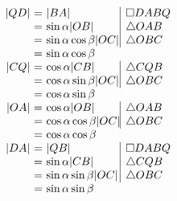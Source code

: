 \begin{frame}
\begin{columns}
$
\begin{array}{r@{~}c@{~}l@{}l@{}|l@{}}
|QD|&=&|BA| &&\square DABQ\\
&=& \sin \alpha |OB| &&\triangle OAB\\
&=&\sin\alpha \cos\beta |OC| &&\triangle OBC\\
&=&\sin\alpha \cos \beta\\
|CQ|&=&\cos \alpha |CB|  && \triangle CQB\\
&=&\cos \alpha \sin \beta |OC|  && \triangle OBC\\
&=&\cos \alpha \sin \beta  \\
|OA|&=&\cos \alpha |OB| &&\triangle OAB\\
&=&\cos \alpha \cos \beta |OC|&&\triangle OBC\\
&=&\cos \alpha \cos \beta\\
|DA|&=&|QB|&&\square DABQ\\
&=&\sin \alpha |CB| &&\triangle CQB\\
&=&\sin\alpha \sin\beta|OC|&&\triangle OBC\\
&=&\sin \alpha \sin \beta\\
\end{array}
$

\end{columns}

\end{frame}

